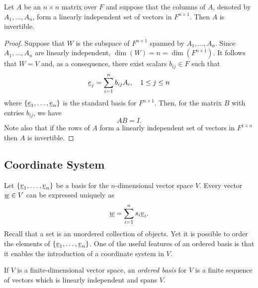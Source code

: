 \begin{theorem}
Let $A$ be an $n \times n$ matrix over $F$ and suppose that the columns of $A$, denoted by $A_1, \ldots, A_n$, form a linearly independent set of vectors in $F^{n \times 1}$.
Then $A$ is invertible.
\end{theorem}
\begin{proof}
Suppose that $W$ is the subspace of $F^{n \times 1}$ spanned by $A_1, \ldots, A_n$.
Since $A_1, \ldots, A_n$ are linearly independent, $\dim(W) = n = \dim(F^{n \times 1})$.
It follows that $W = V$ and, as a consequence, there exist scalars $b_{ij} \in F$ such that
\begin{equation*}
\underline{e}_j = \sum_{i=1}^n b_{ij} A_i, \quad 1 \leq j \leq n
\end{equation*}
where $\left\{ \underline{e}_1, \ldots, \underline{e}_n \right\}$ is the standard basis for $F^{n \times 1}$.
Then, for the matrix $B$ with entries $b_{ij}$, we have
\begin{equation*}
AB = I.
\end{equation*}
Note also that if the rows of $A$ form a linearly independent set of vectors in $F^{1 \times n}$ then $A$ is invertible.
\end{proof}


\subsection{Coordinate System}

Let $\left\{ \underline{v}_1, \ldots, \underline{v}_n \right\}$ be a basis for the $n$-dimensional vector space $V$.
Every vector $\underline{w} \in V$ can be expressed uniquely as
\begin{equation*}
\underline{w} = \sum_{i=1}^n s_i \underline{v}_i.
\end{equation*}
Recall that a set is an unordered collection of objects.
Yet it is possible to order the elements of $\left\{ \underline{v}_1, \ldots, \underline{v}_n \right\}$.
One of the useful features of an ordered basis is that it enables the introduction of a coordinate system in $V$.

\begin{definition}
If $V$ is a finite-dimensional vector space, an \emph{ordered basis} for $V$ is a finite sequence of vectors which is linearly independent and spans $V$.
\end{definition}

